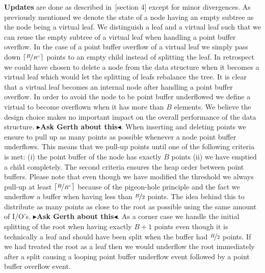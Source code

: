 \documentclass[twoside,11pt,openright]{report}
\def \epsilon {\varepsilon}
\newcommand{\todo}[1]{{\color[rgb]{.5,0,0}\textbf{$\blacktriangleright$#1$\blacktriangleleft$}}}
\begin{document}
\textbf{Updates} are done as described in~\cite{DBLP:journals/corr/Brodal15}[section 4] except for minor divergences. As previously mentioned we denote the state of a node having an empty subtree as the node being a virtual leaf. We distinguish a leaf and a virtual leaf such that we can reuse the empty subtree of a virtual leaf when handling a point buffer overflow. In the case of a point buffer overflow of a virtual leaf we simply pass down $\lceil \nicefrac{B}{B^{\epsilon}} \rceil$ points to an empty child instead of splitting the leaf. In retrospect we could have chosen to delete a node from the data structure when it becomes a virtual leaf which would let the splitting of leafs rebalance the tree. It is clear that a virtual leaf becomes an internal node after handling a point buffer overflow. In order to avoid the node to be point buffer underflowed we define a virtual to become overflown when it has more than $B$ elements. We believe the design choice makes no important impact on the overall performance of the data structure. \todo{Ask Gerth about this}. When inserting and deleting points we ensure to pull up as many points as possible whenever a node point buffer underflows. This means that we pull-up points until one of the following criteria is met: (i) the point buffer of the node has exactly $B$ points (ii) we have emptied a child completely. The second criteria ensures the heap order between point buffers. Please note that even though we have modified the threshold we always pull-up at least $\lceil \nicefrac{B}{B^{\epsilon}} \rceil$ because of the pigeon-hole principle and the fact we underflow a buffer when having less than $\nicefrac{B}{2}$ points. The idea behind this to distribute as many points as close to the root as possible using the same amount of I/O's. \todo{Ask Gerth about this}. As a corner case we handle the initial splitting of the root when having exactly $B+1$ points even though it is technically a leaf and should have been split when the buffer had $\nicefrac{B}{2}$ points. If we had treated the root as a leaf then we would underflow the root immediately after a split causing a looping point buffer underflow event followed by a point buffer overflow event.
\end{document}
